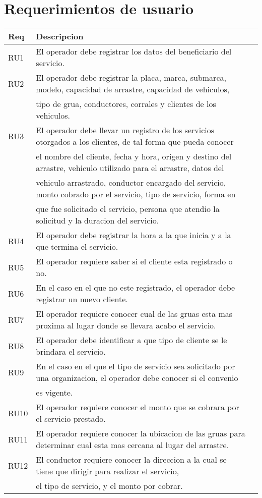 \section{Requerimientos de usuario}
\begin{tabular}{||l | l | r||} \hline \hline Req & Descripcion  \\ \hline
RU1 & El operador debe registrar los datos del beneficiario del servicio. \\ \hline 
RU2 & El operador debe registrar la placa, marca, submarca, modelo, capacidad de arrastre, capacidad de vehiculos, \\ & tipo de grua, conductores, corrales y clientes  de los vehiculos.
 \\ \hline 
RU3 & El operador debe llevar un registro de los servicios otorgados a los clientes, de tal forma que pueda conocer \\ &el nombre del cliente, fecha y hora, origen y destino del arrastre, vehiculo utilizado para el arrastre, datos del \\ &vehiculo arrastrado, conductor encargado del servicio, monto cobrado por el servicio, tipo de servicio, forma en  \\ & que fue solicitado el servicio, persona que atendio la solicitud y la duracion del servicio. \\ \hline 
RU4 & El operador debe registrar la hora a la que inicia y a la que termina el servicio. \\ \hline 
RU5 & El operador requiere saber si el cliente esta registrado o no. \\ \hline 
RU6 & En el caso en el que no este registrado, el operador debe registrar un nuevo cliente. \\ \hline 
RU7 & El operador requiere conocer cual de las gruas esta mas proxima al lugar donde se llevara acabo el servicio. \\ \hline 
RU8 & El operador debe identificar a que tipo de cliente se le brindara el servicio. \\ \hline 
RU9 & En el caso en el que el tipo de servicio sea solicitado por una organizacion, el operador debe conocer si el convenio \\ & es vigente. \\ \hline 
RU10 & El operador requiere conocer el monto que se cobrara por el servicio prestado.\\ \hline 
RU11 & El operador requiere conocer la ubicacion de las gruas para determinar cual esta mas cercana al lugar del arrastre. \\ \hline 
RU12 & El conductor requiere conocer la direccion a la cual se tiene que dirigir para realizar el servicio, \\ & el tipo de servicio, y el monto por cobrar. \\ \hline 

\end{tabular}

